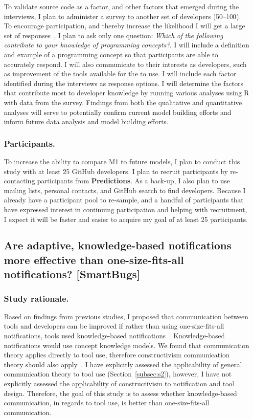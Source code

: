 \documentclass{llncs}
\begin{document}
To validate source code as a factor, and other factors that emerged during the interviews, I plan to administer a survey to another set of developers (50--100). To encourage participation, and thereby increase the likelihood I will get a large set of responses~\cite{smith2013improving}, I plan to ask only one question: \emph{Which of the following contribute to your knowledge of programming concepts?}. I will include a definition and example of a programming concept so that participants are able to accurately respond. I will also communicate to their interests as developers, such as improvement of the tools available for the to use.
I will include each factor identified during the interviews as response options.
I will determine the factors that contribute most to developer knowledge by running various analyses using R with data from the survey. Findings from both the qualitative and quantitative analyses will serve to potentially confirm current model building efforts and inform future data analysis and model building efforts.

\subsubsection{Participants.} To increase the ability to compare M1 to future models, I plan to conduct this study with at least 25 GitHub developers. I plan to recruit participants by re-contacting participants from \textbf{Predictions}. As a back-up, I also plan to use mailing lists, personal contacts, and GitHub search to find developers. Because I already have a participant pool to re-sample, and a handful of participants that have expressed interest in continuing participation and helping with recruitment, I expect it will be faster and easier to acquire my goal of at least 25 participants.

\subsection{Are adaptive, knowledge-based notifications more effective than one-size-fits-all notifications? [SmartBugs]} \label{subsec:s5}
\subsubsection{Study rationale.}
Based on findings from previous studies, I proposed that communication between tools and developers can be improved if rather than using one-size-fits-all notifications, tools used knowledge-based notifications~\cite{johnson2015bespoke}. Knowledge-based notifications would use concept knowledge models. We found that communication theory applies directly to tool use, therefore constructivism communication theory should also apply~\cite{griffin2011first}. 
I have explicitly assessed the applicability of general communication theory to tool use (Section~\ref{subsec:s2}), however, I have not explicitly assessed the applicability of constructivism to notification and tool design. Therefore, the goal of this study is to assess whether knowledge-based communication, in regards to tool use, is better than one-size-fits-all communication.
\end{document}
